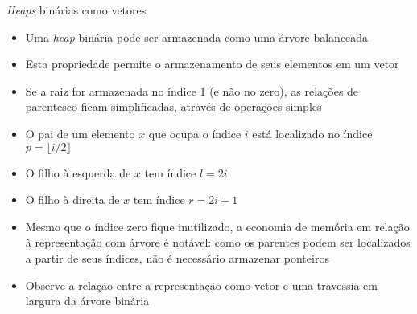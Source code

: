 \begin{frame}[fragile]{\textit{Heaps} binárias como vetores}

    \begin{itemize}
        \item Uma \textit{heap} binária pode ser armazenada como uma árvore balanceada

        \item Esta propriedade permite o armazenamento de seus elementos em um vetor

        \item Se a raiz for armazenada no índice 1 (e não no zero), as relações de parentesco
            ficam simplificadas, através de operações simples

        \item O pai de um elemento $x$ que ocupa o índice $i$ está localizado no índice 
            $p = \lfloor i/2\rfloor$

        \item O filho à esquerda de $x$ tem índice $l = 2i$
        \item O filho à direita  de $x$ tem índice $r = 2i + 1$

        \item Mesmo que o índice zero fique inutilizado, a economia de memória em relação à 
            representação com árvore é notável: como os parentes podem ser localizados a partir
            de seus índices, não é necessário armazenar ponteiros

        \item Observe a relação entre a representação como vetor e uma travessia em largura
            da árvore binária
    \end{itemize}

\end{frame}


